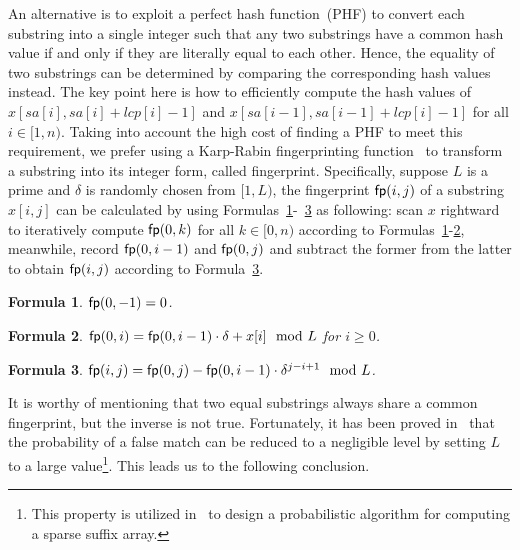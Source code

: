 \documentclass[10pt,journal,compsoc]{IEEEtran}
\newtheorem{Formula}{Formula}
\begin{document}
An alternative is to exploit a perfect hash function~(PHF) to convert each substring into a single integer such that any two substrings have a common hash value if and only if they are literally equal to each other. Hence, the equality of two substrings can be determined by comparing the corresponding hash values instead. The key point here is how to efficiently compute the hash values of $x[sa[i], sa[i] + lcp[i] - 1]$ and $x[sa[i - 1], sa[i - 1] + lcp[i] - 1]$ for all $i \in [1, n)$. Taking into account the high cost of finding a PHF to meet this requirement, we prefer using a Karp-Rabin fingerprinting function~\cite{Karp1987} to transform a substring into its integer form, called fingerprint. Specifically, suppose $L$ is a prime and $\delta$ is randomly chosen from $[1, L)$, the fingerprint ${\sf fp}(i, j)$ of a substring $x[i, j]$ can be calculated by using Formulas~\ref{formula:1}-~\ref{formula:3} as following: scan $x$ rightward to iteratively compute ${\sf fp}(0, k)$ for all $k \in [0, n)$ according to Formulas~\ref{formula:1}-\ref{formula:2}, meanwhile, record ${\sf fp}(0, i - 1)$ and ${\sf fp}(0, j)$ and subtract the former from the latter to obtain ${\sf fp}(i, j)$ according to Formula~\ref{formula:3}. 

\begin{Formula} \label{formula:1}
	${\sf fp}(0, -1) = 0$.
	
\end{Formula}

\begin{Formula} \label{formula:2}	
	${\sf fp}(0, i) = {\sf fp}(0, i - 1) \cdot {\delta} + x[i]\mod L$ for $i \ge 0$.
	
\end{Formula}

\begin{Formula} \label{formula:3}
	${\sf fp}(i, j) = {\sf fp}(0, j) - {\sf fp}(0 ,i - 1) \cdot {\delta}^{j - i + 1}\mod L$.
	
\end{Formula}

It is worthy of mentioning that two equal substrings always share a common fingerprint, but the inverse is not true. Fortunately, it has been proved in~\cite{Karp1987} that the probability of a false match can be reduced to a negligible level by setting $L$ to a large value\footnote{This property is utilized in~\cite{Bille2013} to design a probabilistic algorithm for computing a sparse suffix array. }. This leads us to the following conclusion.
\end{document}
